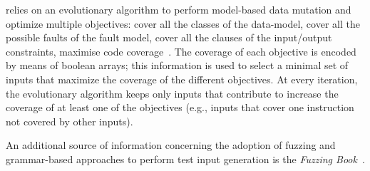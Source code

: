  relies on an evolutionary algorithm to perform model-based data mutation and optimize multiple objectives:  
cover all the classes of the data-model, cover all the possible faults of the fault model, cover all the clauses of the input/output constraints,
maximise code coverage~\cite{di2015evolutionary}.
The coverage of each objective is encoded by means of boolean arrays; this information is used to select a minimal set of inputs that maximize the coverage of the different objectives.
At every iteration, the evolutionary algorithm keeps only inputs that contribute to increase the coverage of at least one of the objectives (e.g., inputs that cover one instruction not covered by other inputs).

An additional source of information concerning the adoption of fuzzing and grammar-based approaches to perform test input generation is the \emph{Fuzzing Book}~\cite{fuzzingbook2019:GrammarFuzzer}.


\clearpage